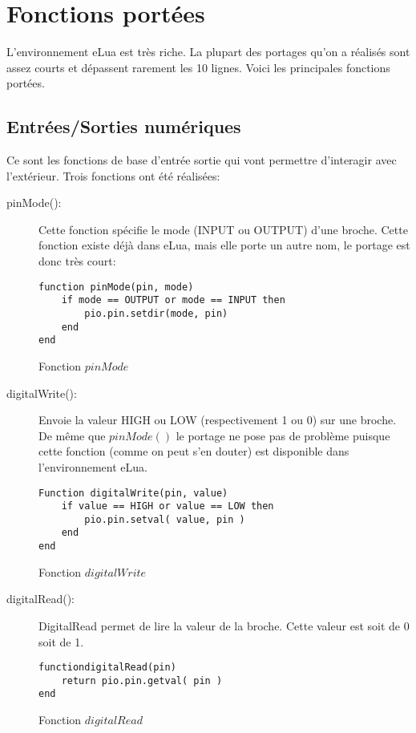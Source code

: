 \chapter[Fonctions portées]{Fonctions portées}
\label{chap:chap6}


L'environnement eLua est très riche.
La plupart des portages qu’on a réalisés sont assez courts et dépassent rarement les 10 lignes. Voici les principales fonctions portées.

\section{Entrées/Sorties numériques}

Ce sont les fonctions de base d’entrée sortie qui vont permettre d’interagir avec l’extérieur.  Trois fonctions ont été réalisées: 

\begin{description}
 \item[pinMode(): ] Cette fonction spécifie le mode (INPUT ou OUTPUT) d’une broche. 
Cette fonction existe déjà dans eLua, mais elle porte un autre nom, le portage est donc très court:

\begin{table}[h]
\begin{lstlisting}
function pinMode(pin, mode)
    if mode == OUTPUT or mode == INPUT then
        pio.pin.setdir(mode, pin)
    end
end
\end{lstlisting}
\caption{Fonction $pinMode$}
\end{table}

\item[digitalWrite(): ] Envoie la valeur HIGH ou LOW (respectivement 1 ou 0) sur une broche. De même que $pinMode()$ 
le portage ne pose pas de problème puisque cette fonction (comme on peut s’en douter) est disponible dans l’environnement eLua.
\newpage
\begin{table}[h]
\begin{lstlisting}
Function digitalWrite(pin, value)
    if value == HIGH or value == LOW then
        pio.pin.setval( value, pin )
    end
end
\end{lstlisting}
\caption{Fonction $digitalWrite$}
\end{table}

\item[digitalRead(): ] DigitalRead permet de lire la valeur de la broche. Cette valeur est soit de 0 soit de 1.
\begin{table}[h]
\begin{lstlisting}
functiondigitalRead(pin)
    return pio.pin.getval( pin )
end
\end{lstlisting}
\caption{Fonction $digitalRead$}
\end{table}


\end{description}

